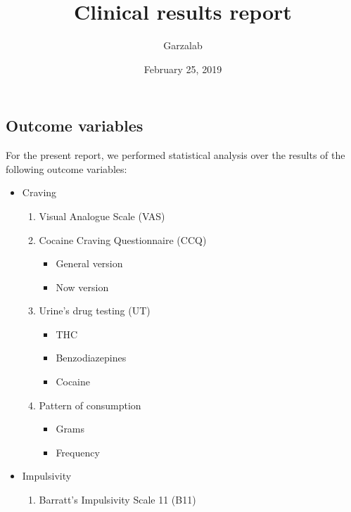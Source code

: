 \documentclass[]{article}
\title{Clinical results report}
\author{Garzalab}
\date{February 25, 2019}
\providecommand{\tightlist}{%
  \setlength{\itemsep}{0pt}\setlength{\parskip}{0pt}}
\begin{document}
\maketitle

\hypertarget{outcome-variables}{%
\subsection{Outcome variables}\label{outcome-variables}}

For the present report, we performed statistical analysis over the
results of the following outcome variables:

\begin{itemize}
\tightlist
\item
  Craving

  \begin{enumerate}
  \def\labelenumi{\arabic{enumi}.}
  \tightlist
  \item
    Visual Analogue Scale (VAS)
  \item
    Cocaine Craving Questionnaire (CCQ)

    \begin{itemize}
    \tightlist
    \item
      General version
    \item
      Now version
    \end{itemize}
  \item
    Urine's drug testing (UT)

    \begin{itemize}
    \tightlist
    \item
      THC
    \item
      Benzodiazepines
    \item
      Cocaine
    \end{itemize}
  \item
    Pattern of consumption

    \begin{itemize}
    \tightlist
    \item
      Grams
    \item
      Frequency
    \end{itemize}
  \end{enumerate}
\item
  Impulsivity

  \begin{enumerate}
  \def\labelenumi{\arabic{enumi}.}
  \tightlist
  \item
    Barratt's Impulsivity Scale 11 (B11)


\end{enumerate}
\end{itemize}
\end{document}
